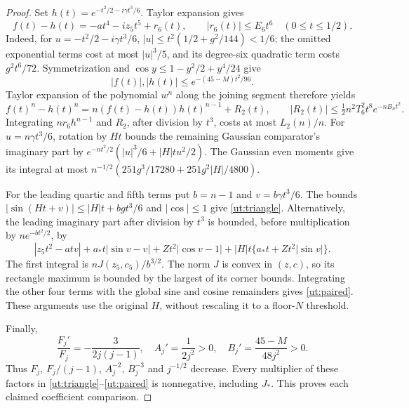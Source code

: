 \begin{proof}
Set $h(t)=e^{-t^2/2-i\gamma t^3/6}$. Taylor expansion gives
\[
 f(t)-h(t)=-at^4-iz_5t^5+r_6(t),\qquad
 |r_6(t)|\le E_6t^6\quad(0\le t\le1/2).
\]
Indeed, for $u=-t^2/2-i\gamma t^3/6$,
$|u|\le t^2(1/2+g^2/144)<1/6$;
the omitted exponential terms cost at most $|u|^3/5$, and its
degree-six quadratic term costs $g^2t^6/72$.
Symmetrization and $\cos y\le1-y^2/2+y^4/24$ give
\[
 |f(t)|,|h(t)|\le e^{-(45-M)t^2/96}.
\]
Taylor expansion of the polynomial $w^n$ along the joining segment
therefore yields
\[
 f(t)^n-h(t)^n=n(f(t)-h(t))h(t)^{n-1}+R_2(t),\qquad
 |R_2(t)|\le\tfrac12n^2T_6^2t^8e^{-nB_nt^2}.
\]
Integrating $nr_6h^{n-1}$ and $R_2$, after division by $t^3$,
costs at most $L_2(n)/n$.
For $u=n\gamma t^3/6$, rotation by $Ht$ bounds the remaining
Gaussian comparator's imaginary part by
$e^{-nt^2/2}(|u|^3/6+|H|t u^2/2)$.
The Gaussian even moments give its integral at most
$n^{-1/2}(251g^3/17280+251g^2|H|/4800)$.

For the leading quartic and fifth terms put $b=n-1$ and
$v=b\gamma t^3/6$. The bounds
$|\sin(Ht+v)|\le|H|t+bg t^3/6$ and $|\cos|\le1$
give \eqref{ut:triangle}.
Alternatively, the leading imaginary part after division by $t^3$
is bounded, before multiplication by $ne^{-bt^2/2}$, by
\[
 |z_5t^2-atv|+a_*t|\sin v-v|+Zt^2|\cos v-1|
                 +|H|t\{a_*t+Zt^2|\sin v|\}.
\]
The first integral is $nJ(z_5,c_5)/b^{3/2}$.
The norm $J$ is convex in $(z,c)$, so its rectangle maximum is
bounded by the largest of its corner bounds. Integrating the other
four terms with the global sine and cosine remainders gives
\eqref{ut:paired}. These arguments use the original $H$, without
rescaling it to a floor-$N$ threshold.

Finally,
\[
 \frac{F_j'}{F_j}=-\frac3{2j(j-1)},\quad
 A_j'=\frac1{2j^2}>0,\quad B_j'=\frac{45-M}{48j^2}>0.
\]
Thus $F_j$, $F_j/(j-1)$, $A_j^{-2}$, $B_j^{-3}$ and
$j^{-1/2}$ decrease. Every multiplier of these factors in
\eqref{ut:triangle}--\eqref{ut:paired} is nonnegative, including
$J_*$. This proves each claimed coefficient comparison.
\end{proof}

